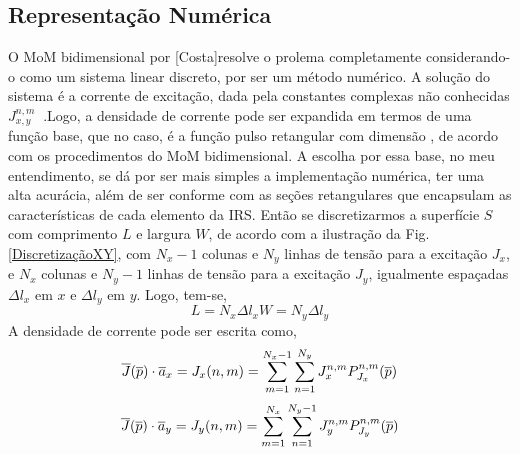 \documentclass[
	12pt,				%
	openright,			%
	oneside,			%
	a4papey79r,			%
	english,			%
	brazil				%
	]{abntex2}
\begin{document}
\subsection{ Representação Numérica}
O MoM  bidimensional por [Costa]resolve o prolema completamente considerando-o como um sistema linear discreto, por ser um método numérico.  A solução do sistema é a corrente de excitação, dada pela constantes complexas não conhecidas $J_{x,y}^{n,m} \ $ .Logo, a densidade de corrente pode ser expandida em termos de uma função base, que no caso, é a função pulso retangular com dimensão , de acordo com os procedimentos do MoM bidimensional. A escolha por essa base, no meu entendimento, se dá por ser mais simples a implementação numérica, ter uma alta acurácia, além de ser conforme com as seções retangulares que encapsulam as características de cada elemento da IRS. Então se discretizarmos a superfície $S$  com comprimento $L$  e largura $W$, de acordo com a ilustração da Fig. \ref{DiscretizaçãoXY}, com $N_x-1$ colunas e $N_y$ linhas de tensão para a excitação $J_x$, e $N_x$ colunas e $N_y-1$ linhas de tensão para a excitação $J_y$, igualmente espaçadas $\Delta l_x$  em $x$ e $\Delta l_y$ em $y$.  Logo, tem-se,
\begin{subequations}
    \begin{equation}
    L=N_x {\Delta l}_x
\end{equation}
  \begin{equation}
    W=N_y {\Delta l}_y
\end{equation}
\end{subequations}
A densidade de corrente pode ser escrita como,
\begin{equation}{\label{ExpansãoJx}}
    \overline{J}(\overline{p}) \cdot \overline{a}_x=J_x(n,m)=\sum_{m=1}^{N_x-1}\sum_{n=1}^{N_y} J_{x}^{n,m}P_{J_x}^{n,m}(\overline{p})
\end{equation}
\begin{equation}{\label{ExpansãoJy}}
    \overline{J}(\overline{p}) \cdot \overline{a}_y=J_y(n,m)=
\sum_{m=1}^{N_x}\sum_{n=1}^{N_y-1} J_{y}^{n,m}P_{J_y}^{n,m} (\overline{p})   
\end{equation}
\end{document}

